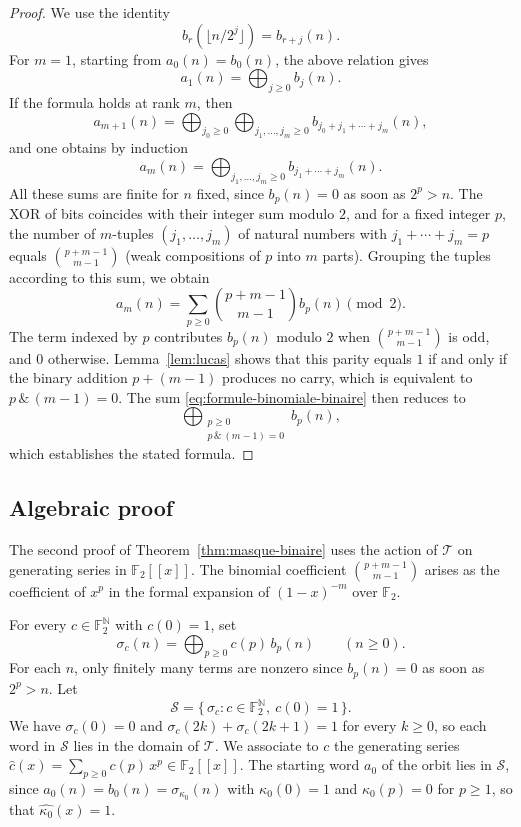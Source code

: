 \documentclass[12pt,reqno]{article}
\newcommand{\N}{\mathbb{N}}
\theoremstyle{plain}
\theoremstyle{definition}
\begin{document}
\begin{proof}
We use the identity
\[
  b_r(\lfloor n/2^j \rfloor) = b_{r+j}(n).
\]
For $m = 1$, starting from $a_0(n) = b_0(n)$, the above relation gives
\[
  a_1(n) = \bigoplus_{j \ge 0} b_j(n).
\]
If the formula holds at rank $m$, then
\[
a_{m+1}(n) = \bigoplus_{j_0 \ge 0} \bigoplus_{j_1, \dots, j_m \ge 0} b_{j_0 + j_1 + \cdots + j_m}(n),
\]
and one obtains by induction
\[
a_m(n) = \bigoplus_{j_1, \dots, j_m \ge 0} b_{j_1 + \cdots + j_m}(n).
\]
All these sums are finite for $n$ fixed, since $b_p(n) = 0$ as soon as $2^p > n$. The XOR of bits coincides with their integer sum modulo $2$, and for a fixed integer $p$, the number of $m$-tuples $(j_1, \dots, j_m)$ of natural numbers with $j_1 + \cdots + j_m = p$ equals $\binom{p+m-1}{m-1}$ (weak compositions of $p$ into $m$ parts). Grouping the tuples according to this sum, we obtain
\begin{equation}
a_m(n) = \sum_{p \ge 0} \binom{p+m-1}{m-1} b_p(n) \pmod 2.
\label{eq:formule-binomiale-binaire}
\end{equation}
The term indexed by $p$ contributes $b_p(n)$ modulo $2$ when $\binom{p+m-1}{m-1}$ is odd, and $0$ otherwise. Lemma~\ref{lem:lucas} shows that this parity equals $1$ if and only if the binary addition $p + (m-1)$ produces no carry, which is equivalent to $p\,\&\,(m-1) = 0$. The sum \eqref{eq:formule-binomiale-binaire} then reduces to
\[
  \bigoplus_{\substack{p \ge 0 \\ p\,\&\,(m-1) = 0}} b_p(n),
\]
which establishes the stated formula.
\end{proof}


\subsection{Algebraic proof}

The second proof of Theorem~\ref{thm:masque-binaire} uses the action of $\mathcal{T}$ on generating series in $\mathbb{F}_2[[x]]$. The binomial coefficient $\binom{p+m-1}{m-1}$ arises as the coefficient of $x^p$ in the formal expansion of $(1-x)^{-m}$ over $\mathbb{F}_2$.

For every $c \in \mathbb{F}_2^{\N}$ with $c(0) = 1$, set
\[
\sigma_c(n) = \bigoplus_{p \ge 0} c(p)\, b_p(n) \qquad (n \ge 0).
\]
For each $n$, only finitely many terms are nonzero since $b_p(n) = 0$ as soon as $2^p > n$. Let
\[
\mathcal{S} = \{\, \sigma_c : c \in \mathbb{F}_2^{\N},\ c(0) = 1 \,\}.
\]
We have $\sigma_c(0) = 0$ and $\sigma_c(2k) + \sigma_c(2k+1) = 1$ for every $k \ge 0$, so each word in $\mathcal{S}$ lies in the domain of $\mathcal{T}$. We associate to $c$ the generating series $\widehat{c}(x) = \sum_{p \ge 0} c(p)\, x^p \in \mathbb{F}_2[[x]]$. The starting word $a_0$ of the orbit lies in $\mathcal{S}$, since $a_0(n) = b_0(n) = \sigma_{\kappa_0}(n)$ with $\kappa_0(0) = 1$ and $\kappa_0(p) = 0$ for $p \ge 1$, so that $\widehat{\kappa_0}(x) = 1$.
\end{document}
